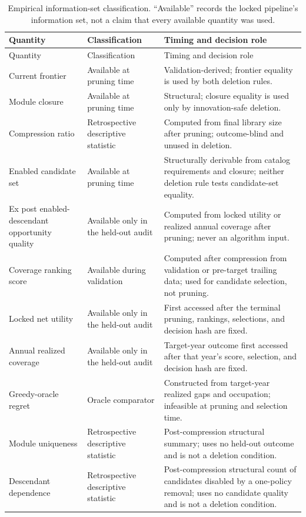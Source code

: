 \begingroup
\normalsize
\setlength{\tabcolsep}{4pt}
\renewcommand{\arraystretch}{1.05}
\begin{longtable}{@{}
  >{\raggedright\arraybackslash}p{}
  >{\raggedright\arraybackslash}p{}
  >{\raggedright\arraybackslash}p{}@{}}
\caption{Empirical information-set classification.  ``Available'' records the
locked pipeline's information set, not a claim that every available quantity
was used.}
\label{tab:financial-information-sets}\\
\toprule
Quantity & Classification & Timing and decision role \\
\midrule
\endfirsthead
\toprule
Quantity & Classification & Timing and decision role \\
\midrule
\endhead
Current frontier &
Available at pruning time &
Validation-derived; frontier equality is used by both deletion rules. \\
Module closure &
Available at pruning time &
Structural; closure equality is used only by innovation-safe deletion. \\
Compression ratio &
Retrospective descriptive statistic &
Computed from final library size after pruning; outcome-blind and unused in
deletion. \\
Enabled candidate set &
Available at pruning time &
Structurally derivable from catalog requirements and closure; neither deletion
rule tests candidate-set equality. \\
Ex post enabled-descendant opportunity quality &
Available only in the held-out audit &
Computed from locked utility or realized annual coverage after pruning; never
an algorithm input. \\
Coverage ranking score &
Available during validation &
Computed after compression from validation or pre-target trailing data; used
for candidate selection, not pruning. \\
Locked net utility &
Available only in the held-out audit &
First accessed after the terminal pruning, rankings, selections, and decision
hash are fixed. \\
Annual realized coverage &
Available only in the held-out audit &
Target-year outcome first accessed after that year's score, selection, and
decision hash are fixed. \\
Greedy-oracle regret &
Oracle comparator &
Constructed from target-year realized gaps and occupation; infeasible at
pruning and selection time. \\
Module uniqueness &
Retrospective descriptive statistic &
Post-compression structural summary; uses no held-out outcome and is not a
deletion condition. \\
Descendant dependence &
Retrospective descriptive statistic &
Post-compression structural count of candidates disabled by a one-policy
removal; uses no candidate quality and is not a deletion condition. \\
\bottomrule
\end{longtable}
\endgroup

